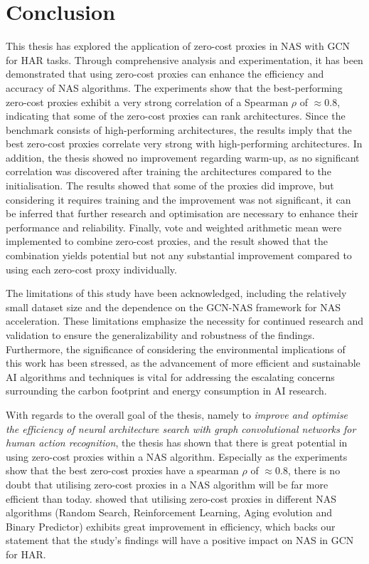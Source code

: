 \section{Conclusion}

This thesis has explored the application of zero-cost proxies in NAS with GCN for HAR tasks. Through comprehensive analysis and experimentation, it has been demonstrated that using zero-cost proxies can enhance the efficiency and accuracy of NAS algorithms. The experiments show that the best-performing zero-cost proxies exhibit a very strong correlation of a Spearman $\rho$ of $\approx 0.8$, indicating that some of the zero-cost proxies can rank architectures. Since the benchmark consists of high-performing architectures, the results imply that the best zero-cost proxies correlate very strong with high-performing architectures. In addition, the thesis showed no improvement regarding warm-up, as no significant correlation was discovered after training the architectures compared to the initialisation. The results showed that some of the proxies did improve, but considering it requires training and the improvement was not significant, it can be inferred that further research and optimisation are necessary to enhance their performance and reliability. Finally, vote and weighted arithmetic mean were implemented to combine zero-cost proxies, and the result showed that the combination yields potential but not any substantial improvement compared to using each zero-cost proxy individually. 
 

The limitations of this study have been acknowledged, including the relatively small dataset size and the dependence on the GCN-NAS framework for NAS acceleration. These limitations emphasize the necessity for continued research and validation to ensure the generalizability and robustness of the findings. Furthermore, the significance of considering the environmental implications of this work has been stressed, as the advancement of more efficient and sustainable AI algorithms and techniques is vital for addressing the escalating concerns surrounding the carbon footprint and energy consumption in AI research.

With regards to the overall goal of the thesis, namely to \textit{improve and optimise the efficiency of neural architecture search with
graph convolutional networks for human action recognition}, the thesis has shown that there is great potential in using zero-cost proxies within a NAS algorithm. Especially as the experiments show that the best zero-cost proxies have a spearman $\rho$ of $\approx 0.8$, there is no doubt that utilising zero-cost proxies in a NAS algorithm will be far more efficient than today. \cite{abdelfattah2021zero} showed that utilising zero-cost proxies in different NAS algorithms (Random Search, Reinforcement Learning, Aging evolution and Binary Predictor) exhibits great improvement in efficiency, which backs our statement that the study's findings will have a positive impact on NAS in GCN for HAR.